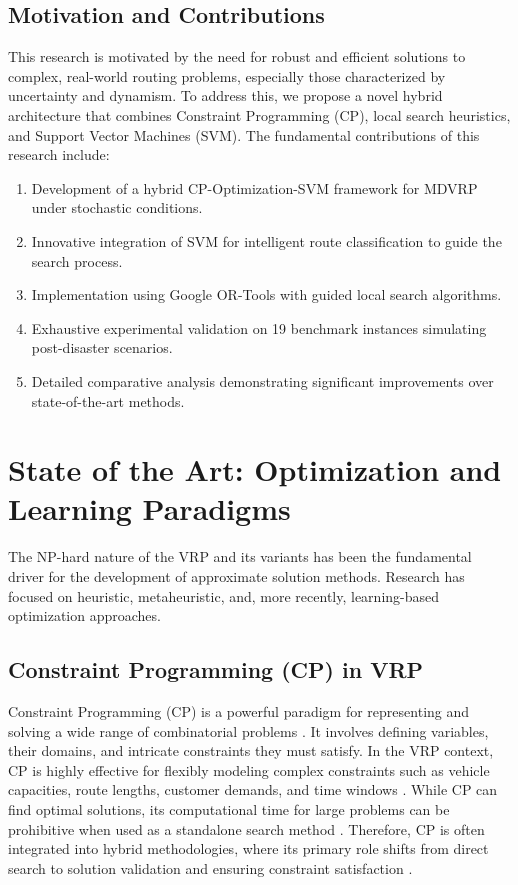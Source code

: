 \documentclass[conference]{IEEEtran} %
\begin{document}
\subsection{Motivation and Contributions}
This research is motivated by the need for robust and efficient solutions to complex, real-world routing problems, especially those characterized by uncertainty and dynamism. To address this, we propose a novel hybrid architecture that combines Constraint Programming (CP), local search heuristics, and Support Vector Machines (SVM). The fundamental contributions of this research include:
\begin{enumerate}
    \item Development of a hybrid CP-Optimization-SVM framework for MDVRP under stochastic conditions.
    \item Innovative integration of SVM for intelligent route classification to guide the search process.
    \item Implementation using Google OR-Tools with guided local search algorithms.
    \item Exhaustive experimental validation on 19 benchmark instances simulating post-disaster scenarios.
    \item Detailed comparative analysis demonstrating significant improvements over state-of-the-art methods.
\end{enumerate}

\section{State of the Art: Optimization and Learning Paradigms}

The NP-hard nature of the VRP and its variants has been the fundamental driver for the development of approximate solution methods. Research has focused on heuristic, metaheuristic, and, more recently, learning-based optimization approaches.

\subsection{Constraint Programming (CP) in VRP}
Constraint Programming (CP) is a powerful paradigm for representing and solving a wide range of combinatorial problems \cite{laborie2018ibm}. It involves defining variables, their domains, and intricate constraints they must satisfy. In the VRP context, CP is highly effective for flexibly modeling complex constraints such as vehicle capacities, route lengths, customer demands, and time windows \cite{shaw1998using}. While CP can find optimal solutions, its computational time for large problems can be prohibitive when used as a standalone search method \cite{demassey2006metaheuristic}. Therefore, CP is often integrated into hybrid methodologies, where its primary role shifts from direct search to solution validation and ensuring constraint satisfaction \cite{laborie2007solving}.
\end{document}
